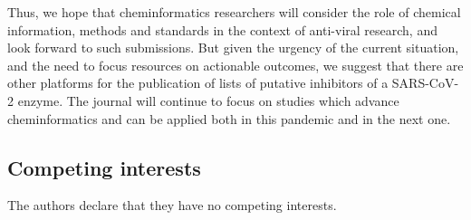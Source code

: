 \documentclass{bmcart}
\begin{document}
Thus, we hope that cheminformatics researchers will consider the role
of chemical information, methods and standards in the context of
anti-viral research, and look forward to such submissions. But given
the urgency of the current situation, and the need to focus resources
on actionable outcomes, we suggest that there are other platforms for
the publication of lists of putative inhibitors of a SARS-CoV-2
enzyme. The journal will continue to focus on studies which advance
cheminformatics and can be applied both in this pandemic and in the
next one.



\begin{backmatter}

\section*{Competing interests}
  The authors declare that they have no competing interests.










\end{backmatter}
\end{document}
